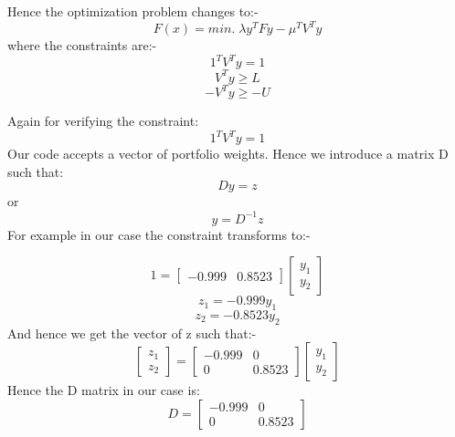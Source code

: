 \documentclass[twoside,11pt]{article}
\begin{document}
Hence the optimization problem changes to:-
\begin{equation}
  F(x) = min.\; \lambda y^TFy - \mu^TV^Ty
\end{equation}
where the constraints are:-
\begin{equation}
  1^TV^Ty = 1
\end{equation}
\begin{equation}
  V^Ty \geqslant L
\end{equation}
\begin{equation}
  -V^Ty \geqslant -U
\end{equation}

Again for verifying the constraint:
\begin{equation}
  1^TV^Ty = 1
\end{equation}
Our code accepts a vector of portfolio weights. Hence we introduce a
matrix D such that:
\begin{equation}
  Dy = z
\end{equation}
or
\begin{equation}
  y = D^{-1}z
\end{equation}
For example in our case the constraint transforms to:-

\[
1 =
  \begin{bmatrix}
    -0.999 & 0.8523    
  \end{bmatrix}
  \begin{bmatrix}
    y_1 \\
    y_2    
  \end{bmatrix}
\]
\begin{equation}
  z_1 = -0.999y_1
\end{equation}
\begin{equation}
  z_2 = -0.8523y_2
\end{equation}
And hence we get the vector of z such that:-
\[
  \begin{bmatrix}
    z_1 \\
    z_2    
  \end{bmatrix}
 =
  \begin{bmatrix}
    -0.999 & 0 \\
    0 & 0.8523
    
  \end{bmatrix}
  \begin{bmatrix}
    y_1 \\
    y_2    
  \end{bmatrix}
\]
Hence the D matrix in our case is:
\[
D =
  \begin{bmatrix}
    -0.999 & 0 \\
    0 & 0.8523
    
  \end{bmatrix}
\]
\end{document}
